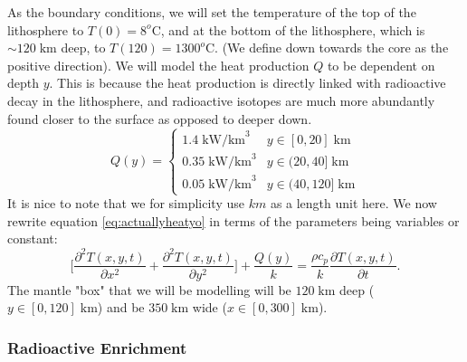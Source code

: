 \documentclass[reprint,english,notitlepage]{revtex4-1}  %
\begin{document}
As the boundary conditions, we will set the temperature of the top of the lithosphere to $T(0) = 8^o\text{C}$, and at the bottom of the lithosphere, which is $\sim 120\;\text{km}$ deep, to $T(120) = 1300^o\text{C}$. (We define down towards the core as the positive direction). We will model the heat production $Q$ to be dependent on depth $y$. This is because the heat production is directly linked with radioactive decay in the lithosphere, and radioactive isotopes are much more abundantly found closer to the surface as opposed to deeper down. 
\begin{equation}
    Q(y) = \begin{cases} 1.4\;\text{kW/km}^3 & y \in [0,20]\;\text{km}\\0.35\;\text{kW/km}^3 & y \in (20,40]\;\text{km}\\0.05\;\text{kW/km}^3 & y \in (40,120]\;\text{km} \end{cases}
\end{equation}
It is nice to note that we for simplicity use $km$ as a length unit here. We now rewrite equation \ref{eq:actuallyheatyo} in terms of the parameters being variables or constant:
\begin{equation}
    \Bigg[\frac{\partial^2 T(x,y,t)}{\partial x^2} + \frac{\partial^2 T(x,y,t)}{\partial y^2}\Bigg] + \frac{Q(y)}{k} = \frac{\rho c_p}{k} \frac{\partial T(x,y,t)}{\partial t}.
\end{equation}
The mantle "box" that we will be modelling will be $120\;\text{km}$ deep ($y \in [0,120]\;\text{km}$) and be $350\;\text{km}$ wide ($x \in [0,300]\;\text{km}$).

\subsubsection{Radioactive Enrichment}
\end{document}
